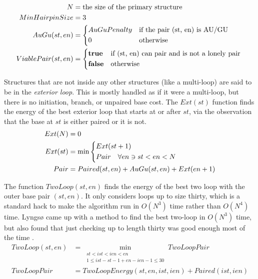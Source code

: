 \documentclass{cshonours}
\newcommand{\lyngso}{Lyngs{\o} }
\begin{document}
\begin{align*}
N &= \text{the size of the primary structure} \\
MinHairpinSize &= 3 \\
AuGu(st, en) &= \begin{dcases*}
AuGuPenalty & if the pair (st, en) is AU/GU \\
0 & otherwise \\
\end{dcases*} \\
ViablePair(st, en) &= \begin{dcases*}
\bf{true} & if (st, en) can pair and is not a lonely pair \\
\bf{false} & otherwise \\
\end{dcases*} \\
\end{align*}

Structures that are not inside any other structures (like a multi-loop) are said to be in the \emph{exterior loop}. This is mostly handled as if it were a multi-loop, but there is no initiation, branch, or unpaired base cost. The $Ext(st)$ function finds the energy of the best exterior loop that starts at or after $st$, via the observation that the base at $st$ is either paired or it is not.
\begin{align*}
Ext(N) &= 0 \\
Ext(st) &= \min \begin{dcases}
  Ext(st + 1) \\
  Pair \quad \forall en \ni st < en < N  \\
\end{dcases} \\
Pair &= Paired(st, en) + AuGu(st, en) + Ext(en + 1) \\
\end{align*}

The function $TwoLoop(st, en)$ finds the energy of the best two loop with the outer base pair $(st, en)$. It only considers loops up to size thirty, which is a standard hack to make the algorithm run in $O(N^3)$ time rather than $O(N^4)$ time. \lyngso came up with a method to find the best two-loop in $O(N^3)$ time, but also found that just checking up to length thirty was good enough most of the time \cite{lyngsoOptimisation}.
\begin{align*}
TwoLoop(st, en) &= \min_{\substack{st < ist < ien < en\\ 1 \leq ist - st - 1 + en - ien - 1 \leq 30}}{
  TwoLoopPair
} \\
TwoLoopPair &= TwoLoopEnergy(st, en, ist, ien) + Paired(ist, ien) \\
\end{align*}
\end{document}
